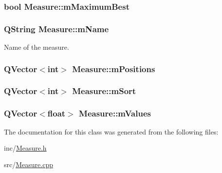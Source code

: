 \hypertarget{class_measure_aecad8c5f694baa1a3061d24beb6b83d5}{
\subsubsection[{m\+Maximum\+Best}]{\setlength{\rightskip}{0pt plus 5cm}bool Measure\+::m\+Maximum\+Best\hspace{0.3cm}{\ttfamily [protected]}}}\label{class_measure_aecad8c5f694baa1a3061d24beb6b83d5}
\hypertarget{class_measure_aeb883353218500dc86ec1796d3fda8ca}{
\subsubsection[{m\+Name}]{\setlength{\rightskip}{0pt plus 5cm}Q\+String Measure\+::m\+Name\hspace{0.3cm}{\ttfamily [protected]}}}\label{class_measure_aeb883353218500dc86ec1796d3fda8ca}


Name of the measure. 

\hypertarget{class_measure_a89450e6468c55f7b04ba20cff16af5d4}{
\subsubsection[{m\+Positions}]{\setlength{\rightskip}{0pt plus 5cm}Q\+Vector$<$int$>$ Measure\+::m\+Positions\hspace{0.3cm}{\ttfamily [protected]}}}\label{class_measure_a89450e6468c55f7b04ba20cff16af5d4}
\hypertarget{class_measure_acbeb61267b8c88b11254a4ab3d475de8}{
\subsubsection[{m\+Sort}]{\setlength{\rightskip}{0pt plus 5cm}Q\+Vector$<$int$>$ Measure\+::m\+Sort\hspace{0.3cm}{\ttfamily [protected]}}}\label{class_measure_acbeb61267b8c88b11254a4ab3d475de8}
\hypertarget{class_measure_a846983f9253d5cd4eceb6cb0409c630e}{
\subsubsection[{m\+Values}]{\setlength{\rightskip}{0pt plus 5cm}Q\+Vector$<$float$>$ Measure\+::m\+Values\hspace{0.3cm}{\ttfamily [protected]}}}\label{class_measure_a846983f9253d5cd4eceb6cb0409c630e}


The documentation for this class was generated from the following files\+:\begin{DoxyCompactItemize}
\item 
inc/\hyperlink{_measure_8h}{Measure.\+h}\item 
src/\hyperlink{_measure_8cpp}{Measure.\+cpp}\end{DoxyCompactItemize}
